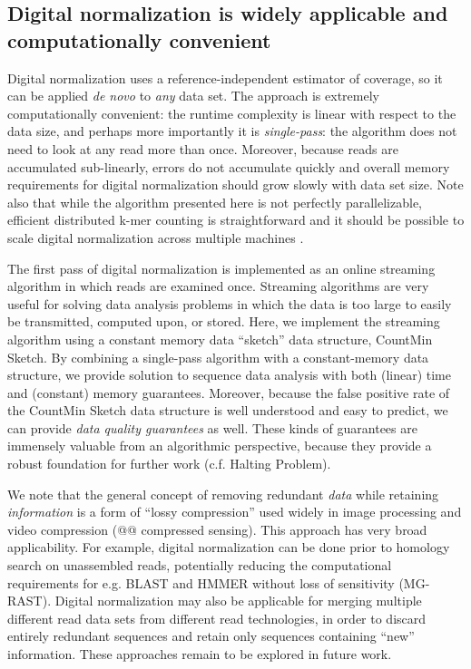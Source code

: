 \documentclass[10pt]{article}
\begin{document}
\subsection*{Digital normalization is widely applicable and computationally convenient}

Digital normalization uses a reference-independent estimator of
coverage, so it can be applied {\em de novo} to {\em any} data set.  The
approach is extremely computationally convenient: the runtime
complexity is linear with respect to the data size, and perhaps more
importantly it is {\em single-pass}: the algorithm does not need to
look at any read more than once.  Moreover, because reads are
accumulated sub-linearly, errors do not accumulate quickly and overall
memory requirements for digital normalization should grow slowly with
data set size.  Note also that while the algorithm presented here is
not perfectly parallelizable, efficient distributed k-mer counting is
straightforward and it should be possible to scale digital normalization
across multiple machines \cite{pubmed19357099}.

The first pass of digital normalization is implemented as an online
streaming algorithm in which reads are examined once.  Streaming
algorithms are very useful for solving data analysis problems in which
the data is too large to easily be transmitted, computed upon, or
stored.  Here, we implement the streaming algorithm using a constant
memory data ``sketch'' data structure, CountMin Sketch.  By combining
a single-pass algorithm with a constant-memory data structure, we
provide solution to sequence data analysis with both (linear) time and
(constant) memory guarantees. Moreover, because the false positive
rate of the CountMin Sketch data structure is well understood and easy
to predict, we can provide {\em data quality guarantees} as well.
These kinds of guarantees are immensely valuable from an algorithmic
perspective, because they provide a robust foundation for further work
(c.f. Halting Problem).

We note that the general concept of removing redundant {\em data}
while retaining {\em information} is a form of ``lossy compression''
used widely in image processing and video compression (@@ compressed
sensing).  This approach has very broad applicability.  For example,
digital normalization can be done prior to homology search on
unassembled reads, potentially reducing the computational requirements
for e.g. BLAST and HMMER without loss of sensitivity (MG-RAST).
Digital normalization may also be applicable for merging multiple
different read data sets from different read technologies, in order to
discard entirely redundant sequences and retain only sequences
containing ``new'' information.  These approaches remain to be
explored in future work.
\end{document}
